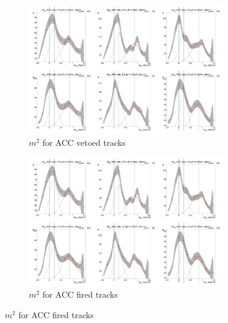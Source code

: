 \begin{figure}[H]
  \ContinuedFloat
    \begin{subfigure}{1\textwidth}
   \centering
   \includegraphics[width=0.94\textwidth]{hiptfits/neg/PSm2_cent0_ich0_accfire0_ptbin13.jpg}
    \caption{$m^2$ for ACC vetoed tracks}
    \end{subfigure}
    \begin{subfigure}{1\textwidth}
   \centering
   \includegraphics[width=0.94\textwidth]{hiptfits/neg/PSm2_cent0_ich0_accfire0_ptbin13.jpg}
    \caption{$m^2$ for ACC fired tracks}
    \end{subfigure}  
\end{figure}

